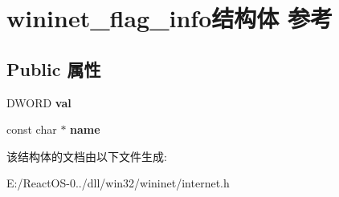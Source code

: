 \hypertarget{structwininet__flag__info}{}\section{wininet\+\_\+flag\+\_\+info结构体 参考}
\label{structwininet__flag__info}
\subsection*{Public 属性}
\begin{DoxyCompactItemize}
\item 
\mbox{\label{structwininet__flag__info_ae68e7e30ccb9340f27434f058c1cd574}} 
D\+W\+O\+RD {\bfseries val}
\item 
\mbox{\label{structwininet__flag__info_ad0e5fe59b9d00d05d467c72431b5a248}} 
const char $\ast$ {\bfseries name}
\end{DoxyCompactItemize}


该结构体的文档由以下文件生成\+:\begin{DoxyCompactItemize}
\item 
E\+:/\+React\+O\+S-\/0../dll/win32/wininet/internet.\+h\end{DoxyCompactItemize}
